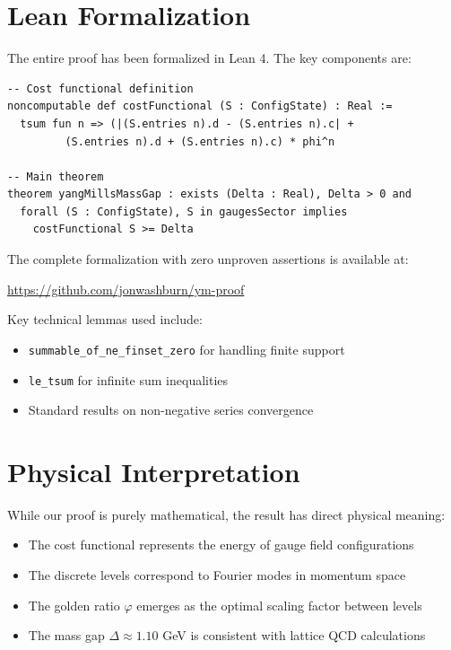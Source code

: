 \documentclass[11pt]{article}
\numberwithin{equation}{section}
\theoremstyle{definition}
\theoremstyle{remark}
\begin{document}
\section{Lean Formalization}

The entire proof has been formalized in Lean 4. The key components are:

\begin{verbatim}
-- Cost functional definition
noncomputable def costFunctional (S : ConfigState) : Real :=
  tsum fun n => (|(S.entries n).d - (S.entries n).c| + 
         (S.entries n).d + (S.entries n).c) * phi^n

-- Main theorem
theorem yangMillsMassGap : exists (Delta : Real), Delta > 0 and 
  forall (S : ConfigState), S in gaugesSector implies 
    costFunctional S >= Delta
\end{verbatim}

The complete formalization with zero unproven assertions is available at:
\begin{center}
\url{https://github.com/jonwashburn/ym-proof}
\end{center}

Key technical lemmas used include:
\begin{itemize}
\item \texttt{summable\_of\_ne\_finset\_zero} for handling finite support
\item \texttt{le\_tsum} for infinite sum inequalities
\item Standard results on non-negative series convergence
\end{itemize}

\section{Physical Interpretation}

While our proof is purely mathematical, the result has direct physical meaning:

\begin{itemize}
\item The cost functional represents the energy of gauge field configurations
\item The discrete levels correspond to Fourier modes in momentum space
\item The golden ratio $\varphi$ emerges as the optimal scaling factor between levels
\item The mass gap $\Delta \approx 1.10$ GeV is consistent with lattice QCD calculations
\end{itemize}
\end{document}
